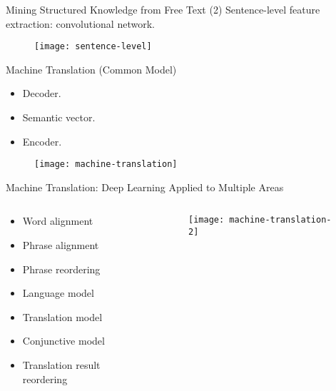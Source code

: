 \begin{frame}{Mining Structured Knowledge from Free Text (2)}
Sentence-level feature extraction: convolutional network.
\begin{figure}[!]
\centering
\texttt{[image: sentence-level]}
\end{figure}
\end{frame}

\begin{frame}{Machine Translation (Common Model)}
\begin{itemize}
\item Decoder.
\item Semantic vector.
\item Encoder.
\end{itemize}
\begin{figure}[!]
\centering
\texttt{[image: machine-translation]}
\end{figure}
\end{frame}

\begin{frame}{Machine Translation: Deep Learning Applied to Multiple Areas}
\begin{columns}[t]
\begin{column}{.4\textwidth}
\begin{itemize}
\item Word alignment
\item Phrase alignment
\item Phrase reordering
\item Language model
\item Translation model
\item Conjunctive model
\item Translation result reordering
\end{itemize}
\end{column}
\begin{column}{.6\textwidth}
\begin{figure}[!]
\centering
\texttt{[image: machine-translation-2]}
\end{figure}
\end{column}
\end{columns}
\end{frame}

